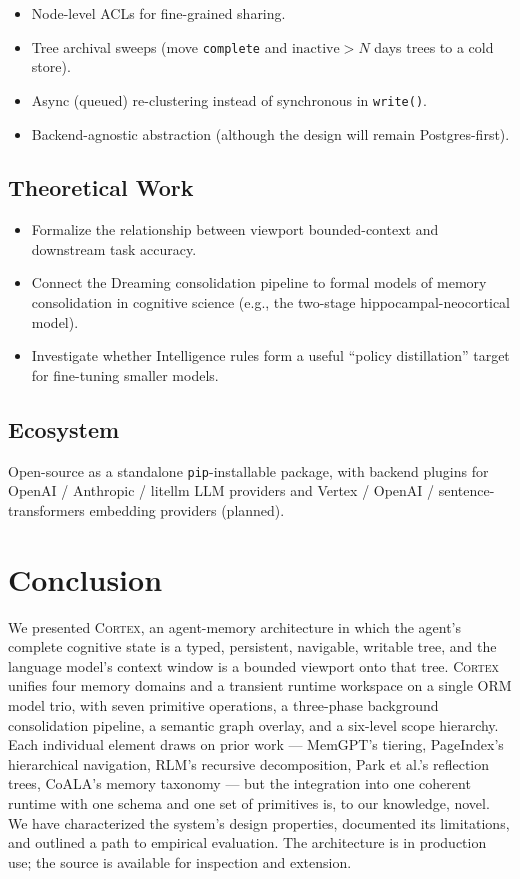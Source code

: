 \documentclass[11pt,a4paper]{article}
\theoremstyle{cortexprop}
\newcommand{\code}[1]{\texttt{#1}}
\begin{document}
\begin{itemize}
  \item Node-level ACLs for fine-grained sharing.
  \item Tree archival sweeps (move \code{complete} and
  $\text{inactive} > N$ days trees to a cold store).
  \item Async (queued) re-clustering instead of synchronous in
  \code{write()}.
  \item Backend-agnostic abstraction (although the design will remain
  Postgres-first).
\end{itemize}

\subsection{Theoretical Work}

\begin{itemize}
  \item Formalize the relationship between viewport bounded-context
  and downstream task accuracy.
  \item Connect the Dreaming consolidation pipeline to formal models
  of memory consolidation in cognitive science (e.g., the two-stage
  hippocampal-neocortical model).
  \item Investigate whether Intelligence rules form a useful ``policy
  distillation'' target for fine-tuning smaller models.
\end{itemize}

\subsection{Ecosystem}

Open-source as a standalone \code{pip}-installable package, with backend
plugins for OpenAI / Anthropic / litellm LLM providers and Vertex /
OpenAI / sentence-transformers embedding providers (planned).

\section{Conclusion}
\label{sec:conclusion}

We presented \textsc{Cortex}, an agent-memory architecture in which the
agent's complete cognitive state is a typed, persistent, navigable,
writable tree, and the language model's context window is a bounded
viewport onto that tree. \textsc{Cortex} unifies four memory domains and
a transient runtime workspace on a single ORM model trio, with seven
primitive operations, a three-phase background consolidation pipeline,
a semantic graph overlay, and a six-level scope hierarchy. Each
individual element draws on prior work --- MemGPT's tiering, PageIndex's
hierarchical navigation, RLM's recursive decomposition, Park et al.'s
reflection trees, CoALA's memory taxonomy --- but the integration into
one coherent runtime with one schema and one set of primitives is, to
our knowledge, novel. We have characterized the system's design
properties, documented its limitations, and outlined a path to
empirical evaluation. The architecture is in production use; the source
is available for inspection and extension.
\end{document}
